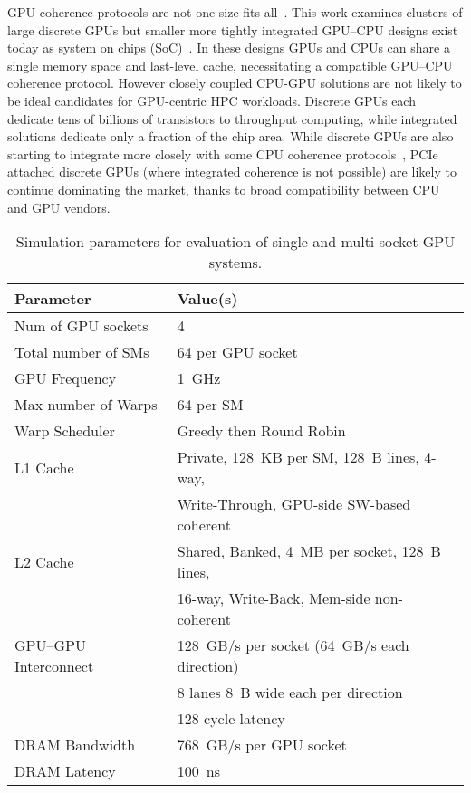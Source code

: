 GPU coherence protocols are not one-size fits all~\cite{sinclair2015efficient, Power2013, ZiabariTACO-16}.  
This work examines clusters 
of large discrete GPUs but smaller
more tightly integrated GPU--CPU designs exist today as system on chips (SoC)~\cite{AMDCARRIZO,INTELSKYLAKEINTEGRATED}.
In these designs GPUs and CPUs can share a single memory space and
last-level cache, necessitating a compatible GPU--CPU coherence protocol. 
However closely coupled CPU-GPU solutions are not likely to be ideal
candidates for GPU-centric HPC workloads.  Discrete GPUs each dedicate tens of billions of transistors 
to throughput computing, while integrated solutions dedicate only a fraction of the
chip area. While discrete GPUs are also starting to integrate more closely with 
some CPU coherence protocols~\cite{agarwal2016selective,ZiabariTACO-16},
PCIe attached discrete GPUs (where integrated coherence
is not possible) are likely to continue dominating the market, thanks to broad 
compatibility between CPU and GPU vendors.

\begin{table}[tp]
\begin{small}
\centering
\begin{tabular}{ll}
\toprule
\textbf{Parameter} & \textbf{Value(s)} \\
\toprule
Num of GPU sockets & 4 \\
\midrule
Total number of SMs & 64 per GPU socket \\
\midrule
GPU Frequency & \SI{1}{GHz} \\
\midrule
Max number of Warps & 64 per SM \\
\midrule
Warp Scheduler & Greedy then Round Robin \\
\midrule
L1 Cache & Private, \SI{128}{KB} per SM, \SI{128}{B} lines, 4-way, \\ 
& Write-Through, GPU-side SW-based coherent \\
\midrule
L2 Cache & Shared, Banked, \SI{4}{MB} per socket, \SI{128}{B} lines,  \\ 
& 16-way, Write-Back, Mem-side non-coherent\\
\midrule
GPU--GPU Interconnect & \SI{128}{GB/s} per socket (\SI{64}{GB/s} each direction) \\
& 8 lanes \SI{8}{B} wide each per direction \\
&128-cycle latency \\
\midrule
DRAM Bandwidth & \SI{768}{GB/s} per GPU socket\\
\midrule
DRAM Latency & \SI{100}{ns} \\
\toprule
\end{tabular}
\vspace{-.1in}
\caption{Simulation parameters for evaluation of single and multi-socket GPU 
systems.}
\vspace{-.2in}
\label{tab:setup}
\end{small}
\end{table} 

